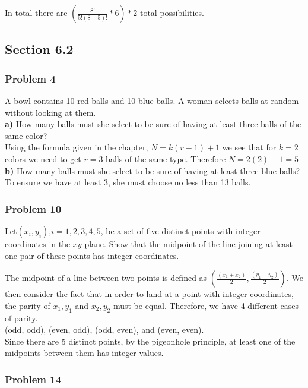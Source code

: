 \documentclass[paper=a4, fontsize=11pt]{scrartcl} %
\begin{document}
In total there are $\left(\frac{8!}{5!(8-5)!} * 6\right)*2$ total possibilities.\\
\subsection*{Section 6.2}
\subsubsection*{Problem 4}
A bowl contains 10 red balls and 10 blue balls. A woman selects balls at random without looking at them.\\

\textbf{a)} How many balls must she select to be sure of having at least three balls of the same color?\\
Using the formula given in the chapter, $N = k(r-1)+1$ we see that for $k=2$ colors we need to get $r=3$ balls of the same type. Therefore $N = 2(2)+1 = 5$\\ 

\textbf{b)} How many balls must she select to be sure of having at least three blue balls?\\
To ensure we have at least 3, she must choose no less than 13 balls.\\

\subsubsection*{Problem 10} 
Let$(x_i,y_i)$,$i = 1,2,3,4,5$, be a set of five distinct points with integer coordinates in the $xy$ plane. Show that the midpoint of the line joining at least one pair of these points has integer coordinates.

The midpoint of a line between two points is defined as $\left(\frac{(x_1+x_2)}{2}, \frac{(y_1+y_2)}{2}\right)$. We then consider the fact that in order to land at a point with integer coordinates, the parity of $x_1, y_1$ and $x_2, y_2$ must be equal. Therefore, we have 4 different cases of parity.\\

(odd, odd), (even, odd), (odd, even), and (even, even).\\

Since there are 5 distinct points, by the pigeonhole principle, at least one of the midpoints between them has integer values.\\

\subsubsection*{Problem 14} 
\end{document}
